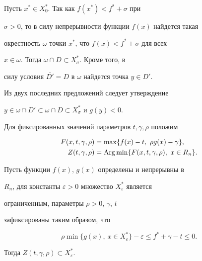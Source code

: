 \begin{pf}


Пусть $x^*\in X_0^*$. Так как $f(x^*)<f^*+\sigma$ при 


$\sigma>0$, то в силу непрерывности функции $f(x)$ найдется такая 


окрестность $\omega$ точки $x^*$, что $f(x)<f^*+\sigma$ для всех 


$x\in \omega$. Тогда $\omega\cap D\subset X_{\sigma}^*$. Кроме того, в


силу условия $\overline{D'}=D$ в $\omega$ найдется точка $y\in D'$.


Из двух последних предложений следует утверждение 


$y\in \omega\cap D'\subset \omega\cap D\subset X_{\sigma}^*$ и $g(y)<0$. 


\end{pf}





Для фиксированных значений параметров $t, \gamma, \rho$ положим


\begin{align*}


F(x,t,\gamma,\rho)&=\max\{f(x)-t,\ \rho g(x)-\gamma\},\\


%


Z(t,\gamma,\rho)&=\Arg\min\{F(x,t,\gamma,\rho),\ x\in R_n\}. 


\end{align*}





\begin{thm}


Пусть функции $f(x)$, $g(x)$ определены и непрерывны в


$R_n$, для константы $\varepsilon>0$ множество $X_{\varepsilon}^*$ является 


ограниченным, параметры $\rho>0$, $\gamma$, $t$


зафиксированы таким образом, что


\begin{equation}


\rho\min\{g(x),\ x\in X_{\varepsilon}^*\}-\varepsilon\le


f^*+\gamma-t\le 0.


\end{equation}


Тогда $Z(t,\gamma,\rho)\subset X_{\varepsilon}^*$.


\end{thm}






